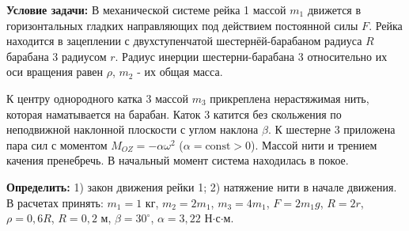 \documentclass{article}
\begin{document}
\begin{minipage}{0.1\textwidth}
\end{minipage}
\hfill
\begin{minipage}{0.45\textwidth}
\par
\vspace{5pt}
\textbf{Условие задачи:}
В механической системе рейка 1 массой $m_1$ движется в горизонтальных гладких направляющих под действием постоянной силы $F$. Рейка находится в зацеплении с двухступенчатой шестернёй-барабаном радиуса $R$ барабана 3 радиусом $r$. Радиус инерции шестерни-барабана 3 относительно их оси вращения равен $\rho$, $m_2$ - их общая масса.
\end{minipage}
\par
\vspace{5pt}
\noindent
 К центру однородного катка 3 массой $m_3$ прикреплена нерастяжимая нить, которая наматывается на барабан. Каток 3 катится без скольжения по неподвижной наклонной плоскости с углом наклона $\beta$. К шестерне 3 приложена пара сил с моментом $M_{OZ} = -\alpha \omega^2$ ($\alpha = \text{const} > 0$). Массой нити и трением качения пренебречь. В начальный момент система находилась в покое. \par 
 \textbf{Определить:} 1) закон движения рейки 1; 2) натяжение нити в начале движения. В расчетах принять: $m_1 = 1$ кг, $m_2 = 2m_1$, $m_3 = 4m_1$, $F = 2m_1g$, $R = 2r$, $\rho = 0,6R$, $R = 0,2$ м, $\beta = 30^\circ$, $\alpha = 3,22$ Н$\cdot$с$\cdot$м.
 \vspace{0.3cm}
\end{document}
